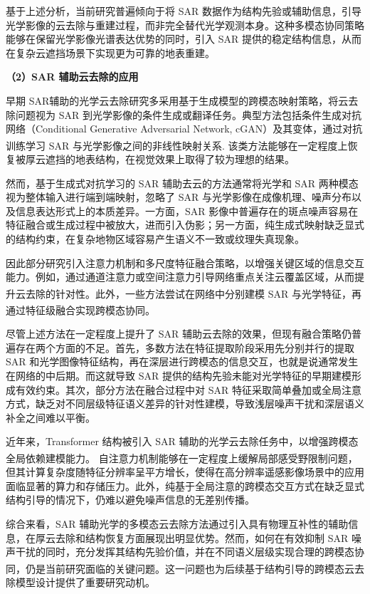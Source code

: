 基于上述分析，当前研究普遍倾向于将 SAR 数据作为结构先验或辅助信息，引导光学影像的云去除与重建过程，而非完全替代光学观测本身。这种多模态协同策略能够在保留光学影像光谱表达优势的同时，引入 SAR 提供的稳定结构信息，从而在复杂云遮挡场景下实现更为可靠的地表重建。

\textbf{（2）SAR 辅助云去除的应用}

早期 SAR辅助的光学云去除研究多采用基于生成模型的跨模态映射策略，将云去除问题视为 SAR 到光学影像的条件生成或翻译任务。典型方法包括条件生成对抗网络（Conditional Generative Adversarial Network, cGAN）及其变体，通过对抗训练学习 SAR 与光学影像之间的非线性映射关系\textsuperscript{\cite{li2020sar}}. 该类方法能够在一定程度上恢复被厚云遮挡的地表结构，在视觉效果上取得了较为理想的结果。

然而，基于生成式对抗学习的 SAR 辅助去云的方法通常将光学和 SAR 两种模态视为整体输入进行端到端映射，忽略了 SAR 与光学影像在成像机理、噪声分布以及信息表达形式上的本质差异。一方面，SAR 影像中普遍存在的斑点噪声容易在特征融合或生成过程中被放大，进而引入伪影；另一方面，纯生成式映射缺乏显式的结构约束，在复杂地物区域容易产生语义不一致或纹理失真现象。

因此部分研究引入注意力机制和多尺度特征融合策略，以增强关键区域的信息交互能力。例如，通过通道注意力或空间注意力引导网络重点关注云覆盖区域，从而提升云去除的针对性\textsuperscript{\cite{hao2023selecting}}。此外，一些方法尝试在网络中分别建模 SAR 与光学特征，再通过特征级融合实现跨模态协同\textsuperscript{\cite{xu2022glf}}。

尽管上述方法在一定程度上提升了 SAR 辅助云去除的效果，但现有融合策略仍普遍存在两个方面的不足。首先，多数方法在特征提取阶段采用先分别并行的提取 SAR 和光学图像特征结构，再在深层进行跨模态的信息交互，也就是说通常发生在网络的中后期。而这就导致 SAR 提供的结构先验未能对光学特征的早期建模形成有效约束。其次，部分方法在融合过程中对 SAR 特征采取简单叠加或全局注意方式，缺乏对不同层级特征语义差异的针对性建模，导致浅层噪声干扰和深层语义补全之间难以平衡。

近年来，Transformer 结构被引入 SAR 辅助的光学云去除任务中，以增强跨模态全局依赖建模能力\textsuperscript{\cite{li2023transformer,han2023former,ma2024sct}}。 自注意力机制能够在一定程度上缓解局部感受野限制问题，但其计算复杂度随特征分辨率呈平方增长，使得在高分辨率遥感影像场景中的应用面临显著的算力和存储压力。此外，纯基于全局注意的跨模态交互方式在缺乏显式结构引导的情况下，仍难以避免噪声信息的无差别传播。

综合来看，SAR 辅助光学的多模态云去除方法通过引入具有物理互补性的辅助信息，在厚云去除和结构恢复方面展现出明显优势。然而，如何在有效抑制 SAR 噪声干扰的同时，充分发挥其结构先验价值，并在不同语义层级实现合理的跨模态协同，仍是当前研究面临的关键问题\textsuperscript{\cite{zhang2020feature}}。这一问题也为后续基于结构引导的跨模态云去除模型设计提供了重要研究动机。

